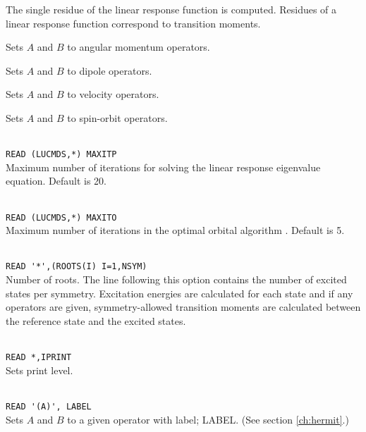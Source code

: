 \begin{description}

\item{}
The single residue of the linear
response function is computed. 
Residues of a linear response function correspond to transition
moments.

\item{}
Sets $A$ and $B$ to angular momentum operators.

\item{}
Sets $A$ and $B$ to dipole operators.

\item{}
Sets $A$ and $B$ to velocity operators.

\item{}
Sets $A$ and $B$ to spin-orbit operators.

\item{}\\
\verb|READ (LUCMDS,*) MAXITP|\\
Maximum number of iterations for solving the linear response eigenvalue
equation. Default is 20.

\item{}\\
\verb|READ (LUCMDS,*) MAXITO|\\
Maximum number of iterations in the optimal orbital
algorithm
\cite{tuhjahjajpjjcp84}. 
Default is 5.

\item{}\\
\verb|READ '*',(ROOTS(I) I=1,NSYM)|\\
Number of roots.  The line following this option contains the number
of excited states per symmetry. Excitation
energies are calculated for each state and if
any operators are given, 
symmetry-allowed transition moments are
calculated between the 
reference state and the excited states.

\item{}\\
\verb|READ *,IPRINT|\\
Sets print level.

\item{}\\
\verb|READ '(A)', LABEL|\\
Sets $A$ and $B$ to a given operator with label; LABEL.
(See section \ref{ch:hermit}.)


\end{description}
